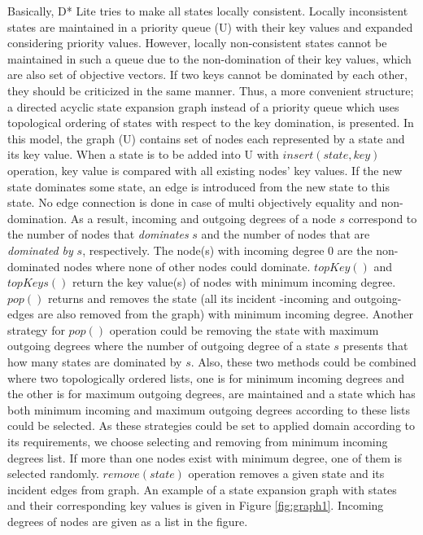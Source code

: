 Basically, D* Lite tries to make all states locally consistent. Locally inconsistent states are maintained in  a priority queue (U) with their key values and expanded considering priority values. However, locally non-consistent states cannot be maintained in such a queue due to the non-domination of their key values, which are also set of objective vectors. If two keys cannot be dominated by each other, they should be criticized in the same manner. Thus, a more convenient structure; a directed acyclic state expansion graph instead of a priority queue which uses topological ordering of states with respect to the key domination, is presented. In this model, the graph (U) contains set of nodes each represented by a state and its key value. When a state is to be added into U with $insert(state, key)$ operation, key value is compared with all existing nodes' key values. If the new state dominates some state, an edge is introduced from the new state to this state. No edge connection is done in case of multi objectively equality and non-domination. As a result, incoming and outgoing degrees of a node $s$ correspond to the number of nodes that \textit{dominates} $s$ and the number of nodes that are \textit{dominated by} $s$, respectively. The node(s) with incoming degree 0 are the non-dominated nodes where none of other nodes could dominate. $topKey()$ and $topKeys()$ return the key value(s) of nodes with minimum incoming degree. $pop()$ returns and removes the state (all its incident -incoming and outgoing- edges are also removed from the graph) with minimum incoming degree. Another strategy for $pop()$ operation could be removing the state with maximum outgoing degrees where the number of outgoing degree of a state $s$ presents that how many states are dominated by $s$. Also, these two methods could be combined where two topologically ordered lists, one is for minimum incoming degrees and the other is for maximum outgoing degrees, are maintained and a state which has both minimum incoming and maximum outgoing degrees according to these lists could be selected. As these strategies could be set to applied domain according to its requirements, we choose selecting and removing from minimum incoming degrees list. If more than one nodes exist with minimum degree, one of them is selected randomly. $remove(state)$ operation removes a given state and its incident edges from graph. An example of a state expansion graph with states and their corresponding key values is given in Figure \ref{fig:graph1}. Incoming degrees of nodes are given as a list in the figure.

